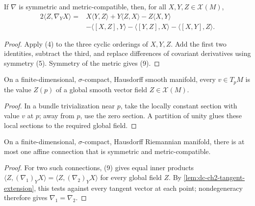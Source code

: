 \begin{lemma}
  \label{lem:dc-ch2-3-6-koszul}
  \leanok
  If $\nabla$ is symmetric and metric-compatible, then, for all
  $X,Y,Z\in\mathcal{X}(M)$,
  \[
    \begin{aligned}
    2\langle Z,\nabla_YX\rangle
      ={}&X\langle Y,Z\rangle+Y\langle Z,X\rangle-Z\langle X,Y\rangle\\
       &-\langle[X,Z],Y\rangle-\langle[Y,Z],X\rangle
        -\langle[X,Y],Z\rangle.
    \end{aligned}\tag{9}
  \]
\end{lemma}
\begin{proof}
  \leanok
  \sketch
  Apply (4) to the three cyclic orderings of $X,Y,Z$. Add the first two
  identities, subtract the third, and replace differences of covariant
  derivatives using symmetry (5). Symmetry of the metric gives (9).
\end{proof}

\begin{lemma}
  \label{lem:dc-ch2-tangent-extension}
  \leanok
  On a finite-dimensional, $\sigma$-compact, Hausdorff smooth manifold, every
  $v\in T_pM$ is the value $Z(p)$ of a global smooth vector field
  $Z\in\mathcal{X}(M)$.
\end{lemma}
\begin{proof}
  \leanok
  \sketch
  In a bundle trivialization near $p$, take the locally constant section with
  value $v$ at $p$; away from $p$, use the zero section. A partition of unity
  glues these local sections to the required global field.
\end{proof}

\begin{lemma}
  \label{lem:dc-ch2-3-6-unique}
  \leanok
  On a finite-dimensional, $\sigma$-compact, Hausdorff Riemannian manifold,
  there is at most one affine connection that is symmetric and
  metric-compatible.
\end{lemma}
\begin{proof}
  \leanok
  \sketch
  For two such connections, (9) gives equal inner products
  $\langle Z,(\nabla_1)_YX\rangle=\langle Z,(\nabla_2)_YX\rangle$ for every
  global field $Z$. By \cref{lem:dc-ch2-tangent-extension}, this tests against
  every tangent vector at each point; nondegeneracy therefore gives
  $\nabla_1=\nabla_2$.
\end{proof}

